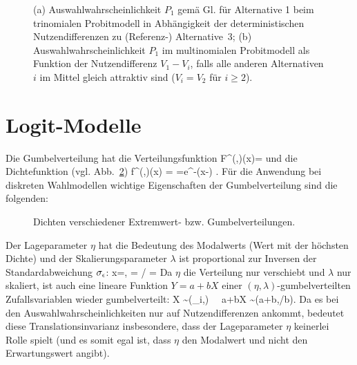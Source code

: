 \begin{figure}
  \caption{\label{fig:multiProbit}(a) Auswahlwahrscheinlichkeit $P_1$
gem\"a\3 Gl. \protect{} f\"ur
Alternative 1 beim
trinomialen  Probitmodell in Abh\"angigkeit der deterministischen
Nutzendifferenzen  zu (Referenz-) Alternative~3; (b) Auswahlwahrscheinlichkeit
$P_1$ im multinomialen Probitmodell als Funktion der Nutzendifferenz
$V_1-V_i$, falls alle anderen Alternativen $i$ im Mittel gleich
attraktiv sind ($V_i=V_2$ f\"ur $i\ge 2$).
}
\end{figure}



\section{\label{sec:Logit}Logit-Modelle}


\noindent
Die Gumbelverteilung hat die Verteilungsfunktion
\be
\label{FGumbel}
F^{(\eta,\lambda)}(x)=\exp {}
\ee
und die Dichtefunktion (vgl. Abb.~\ref{fig:fGumbel})
\be
\label{fGumbel}
f^{(\eta,\lambda)}(x)
=
=\lambda e^{-\lambda(x-\eta)}
\exp {}.
\ee
%
F\"ur die Anwendung bei diskreten Wahlmodellen  wichtige Eigenschaften
der Gumbelverteilung sind die folgenden:

\begin{figure}
  \caption{\label{fig:fGumbel}Dichten verschiedener Extremwert- bzw. Gumbelverteilungen.
}
\end{figure}


\bi
\item Der Lageparameter $\eta$ hat die Bedeutung des 
Modalwerts (Wert mit der h\"ochsten Dichte) und der
Skalierungsparameter $\lambda$ ist proportional zur Inversen der
Standardabweichung $\sigma_{\epsilon}$:
\be
\label{GumbelTransl}
x=\eta, \quad \sigeps=
/\lambda \quad
{} \quad \lambda=
\ee
Da $\eta$ die Verteilung nur verschiebt 
und $\lambda$ nur skaliert, ist
auch eine lineare Funktion $Y=a+bX$ einer $(\eta,\lambda)$-gumbelverteilten
Zufallsvariablen wieder gumbelverteilt: 
\be
\label{Gumbeli}
X \sim {}(\eta_i,\lambda)
\ \Rightarrow \ 
a+bX \sim  {}(a+b\eta,\lambda/b).
\ee
Da es bei den Auswahlwahrscheinlichkeiten nur auf Nutzendifferenzen
ankommt, bedeutet diese Translationsinvarianz insbesondere, dass der
Lageparameter $\eta$ keinerlei Rolle spielt (und es somit egal ist,
dass $\eta$ den Modalwert und nicht den Erwartungswert angibt).

